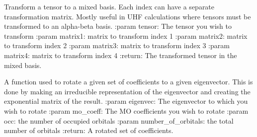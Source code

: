 \documentclass[letterpaper,10pt,english]{sphinxmanual}
\begin{document}

\begin{fulllineitems}
\label{\detokenize{transform:hf.utilities.transform.mix_tensor_to_basis_transform}}
Transform a tensor to a mixed basis. Each index can have a separate transformation matrix.
Mostly useful in UHF calculations where tensors must be transformed to an alpha-beta basis.
:param tensor: The tensor you wish to transform
:param matrix1: matrix to transform index 1
:param matrix2: matrix to transform index 2
:param matrix3: matrix to transform index 3
:param matrix4: matrix to transform index 4
:return: The transformed tensor in the mixed basis.

\end{fulllineitems}


\begin{fulllineitems}
\label{\detokenize{transform:hf.utilities.transform.rotate_to_eigenvec}}
A function used to rotate a given set of coefficients to a given eigenvector.
This is done by making an irreducible representation of the eigenvector and creating the exponential matrix
of the result.
:param eigenvec: The eigenvector to which you wish to rotate
:param mo\_coeff: The MO coefficients you wish to rotate
:param occ: the number of occupied orbitals
:param number\_of\_orbitals: the total number of orbitals
:return: A rotated set of coefficients.

\end{fulllineitems}

\end{document}
